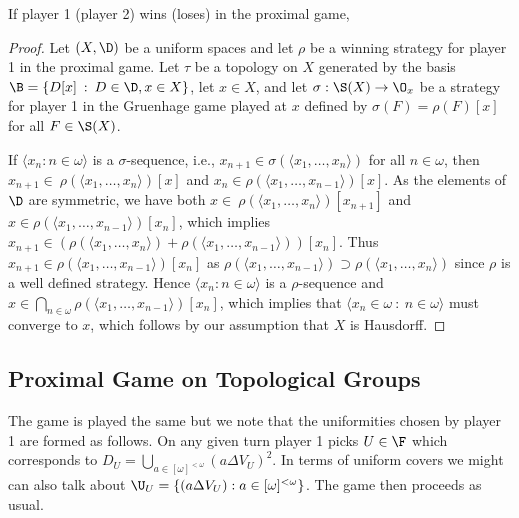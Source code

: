 \documentclass{article}
\begin{document}
\begin{prop}
    If player 1 (player 2) wins (loses) in the proximal game, %
\end{prop}
\begin{proof}
    Let \((X, \D)\) be a uniform spaces and let \(\rho\) be a winning strategy for player 1 in the proximal game. Let \(\tau\) be a topology on \(X\) generated by the basis \(\B = \{D[x] \: : \: D \in \D, x \in X\}\), let \(x \in X\), and let \(\sigma: \S(X) \to \O_x\) be a strategy for player 1 in the Gruenhage game played at \(x\) defined by \(\sigma(F) = \rho(F)[x]\) for all \(F \in \S(X)\). 
    
    If \(\langle x_n : n \in \omega \rangle\) is a \(\sigma\)-sequence, i.e., \(x_{n +1} \in \sigma\left(\langle x_1, \dots, x_n\rangle\right)\) for all \(n \in \omega\), then \(x_{n +1} \in \ \rho\left(\langle x_1, \dots, x_n\rangle\right)[x]\) and \(x_n \in \rho\left(\langle x_1, \dots, x_{n - 1}\rangle\right)[x]\).
    As the elements of \(\D\) are symmetric, we have both \(x \in \ \rho\left(\langle x_1, \dots, x_n\rangle\right)[x_{n + 1}]\) and \(x \in \rho\left(\langle x_1, \dots, x_{n - 1}\rangle\right)[x_n]\), which implies \(x_{n + 1} \in \left(\rho\left(\langle x_1, \dots, x_n\rangle\right) +  \rho\left(\langle x_1, \dots, x_{n - 1}\rangle\right)\right)[x_n]\). Thus \(x_{n + 1} \in \rho\left(\langle x_1, \dots, x_{n - 1}\rangle\right)[x_n]\) as \(\rho\left(\langle x_1, \dots, x_{n - 1}\rangle\right) \supset \rho\left(\langle x_1, \dots, x_n\rangle\right)\) since \(\rho\) is a well defined strategy. Hence \(\langle x_n : n \in \omega \rangle\) is a \(\rho\)-sequence and \(x \in \bigcap_{n \in \omega}\rho\left(\langle x_1, \dots, x_{n - 1}\rangle\right)[x_n]\), which implies that \(\langle x_n \in \omega \: : \: n \in \omega\rangle\) must converge to \(x\), which follows by our assumption that \(X\) is Hausdorff.
\end{proof}

\subsection{Proximal Game on Topological Groups}

The game is played the same but we note that the uniformities chosen by player 1 are formed as follows. On any given turn player 1 picks \(U \in \F\) which corresponds to \(D_U = \bigcup_{a \in [\omega]^{<\omega}}\left(a\Delta V_U\right)^2\). In terms of uniform covers we might can also talk about \(\U_U = \{(a\Delta V_U):a \in [\omega]^{<\omega}\}\). The game then proceeds as usual.
\end{document}
